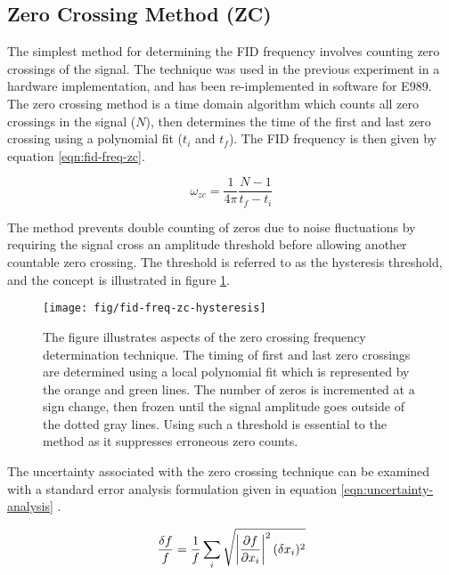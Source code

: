 \subsection{Zero Crossing Method (ZC)}
The simplest method for determining the FID frequency involves counting zero crossings of the signal.  The technique was used in the previous \mugmtwo experiment in a hardware implementation, and has been re-implemented in software for E989.  The zero crossing method is a time domain algorithm which counts all zero crossings in the signal ($N$), then determines the time of the first and last zero crossing using a polynomial fit ($t_i$ and $t_f$).  The FID frequency is then given by equation \ref{eqn:fid-freq-zc}.

\begin{equation}
\label{eqn:fid-freq-zc}
\omega_{zc} = \frac{1}{4 \pi}\frac{N - 1}{t_f - t_i}
\end{equation}

\noindent
The method prevents double counting of zeros due to noise fluctuations by requiring the signal cross an amplitude threshold before allowing another countable zero crossing.  The threshold is referred to as the hysteresis threshold, and the concept is illustrated in figure \ref{fig:fid-freq-zc-hysteresis}.

\begin{figure}
\centering
\texttt{[image: fig/fid-freq-zc-hysteresis]}
\caption{
    The figure illustrates aspects of the zero crossing frequency determination technique.  The timing of first and last zero crossings are determined using a local polynomial fit which is represented by the orange and green lines.  The number of zeros is incremented at a sign change, then frozen until the signal amplitude goes outside of the dotted gray lines.  Using such a threshold is essential to the method as it suppresses erroneous zero counts.
    \label{fig:fid-freq-zc-hysteresis}
}
\end{figure}

The uncertainty associated with the zero crossing technique can be examined with a standard error analysis formulation given in equation \ref{eqn:uncertainty-analysis} \cite{error-taylor}.

\begin{equation}
\label{eqn:uncertainty-analysis}
\frac{\delta f}{f} = \frac{1}{f} \sum_{i} \\
\sqrt{\left| \frac{\partial f}{\partial x_i} \right|^2 (\delta x_i)^2}
\end{equation}


